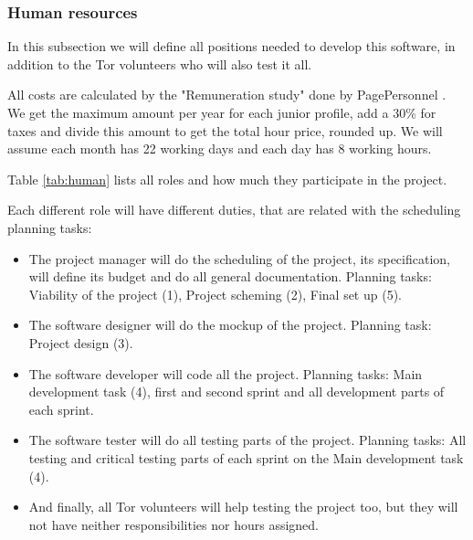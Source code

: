 \subsubsection{Human resources}
\label{sssec:humanResources}
In this subsection we will define all positions needed to develop this software, in addition to the Tor volunteers who will also test it all. 

All costs are calculated by the "Remuneration study" done by PagePersonnel \cite{PagePersonnel}. We get the maximum amount per year for each junior profile, add a 30\% for taxes and divide this amount to get the total hour price, rounded up. We will assume each month has 22 working days and each day has 8 working hours.

Table \ref{tab:human} lists all roles and how much they participate in the project.

Each different role will have different duties, that are related with the scheduling planning tasks:

\begin{itemize}
\item The project manager will do the scheduling of the project, its specification, will define its budget and do all general documentation. Planning tasks: Viability of the project (1), Project scheming (2), Final set up (5).
\item The software designer will do the mockup of the project. Planning task: Project design (3).
\item The software developer will code all the project. Planning tasks: Main development task (4), first and second sprint and all development parts of each sprint.
\item The software tester will do all testing parts of the project. Planning tasks: All testing and critical testing parts of each sprint on the Main development task (4).
\item And finally, all Tor volunteers will help testing the project too, but they will not have neither responsibilities nor hours assigned.
\end{itemize}

